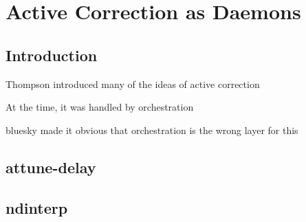 \chapter{Active Correction as Daemons} \label{cha:opa400}

\clearpage

\section{Introduction}  %

Thompson introduced many of the ideas of active correction

At the time, it was handled by orchestration

bluesky made it obvious that orchestration is the wrong layer for this

\clearpage

\section{attune-delay}  %

\clearpage

\section{ndinterp}  %

\clearpage
